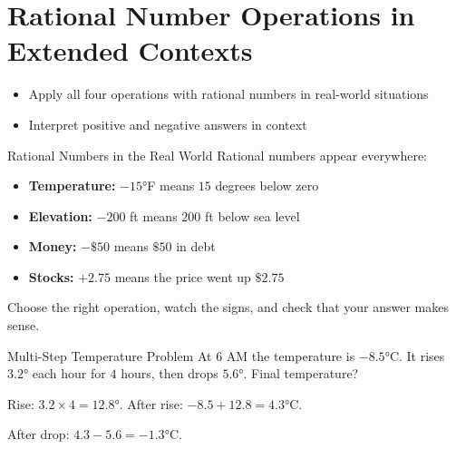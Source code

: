 \section{Rational Number Operations in Extended Contexts}

\begin{learningGoals}
\begin{itemize}
    \item Apply all four operations with rational numbers in real-world situations
    \item Interpret positive and negative answers in context
\end{itemize}
\end{learningGoals}

\begin{conceptBox}{Rational Numbers in the Real World}
Rational numbers appear everywhere:
\begin{itemize}[leftmargin=*]
    \item \textbf{Temperature:} $-15°$F means $15$ degrees below zero
    \item \textbf{Elevation:} $-200$ ft means $200$ ft below sea level
    \item \textbf{Money:} $-\$50$ means $\$50$ in debt
    \item \textbf{Stocks:} $+2.75$ means the price went up $\$2.75$
\end{itemize}
Choose the right operation, watch the signs, and check that your answer makes sense.
\end{conceptBox}

\begin{workedExample}{Multi-Step Temperature Problem}
At $6$ AM the temperature is $-8.5°$C. It rises $3.2°$ each hour for $4$ hours, then drops $5.6°$. Final temperature?

Rise: $3.2 \times 4 = 12.8°$. After rise: $-8.5 + 12.8 = 4.3°$C.

After drop: $4.3 - 5.6 = -1.3°$C.
\end{workedExample}


